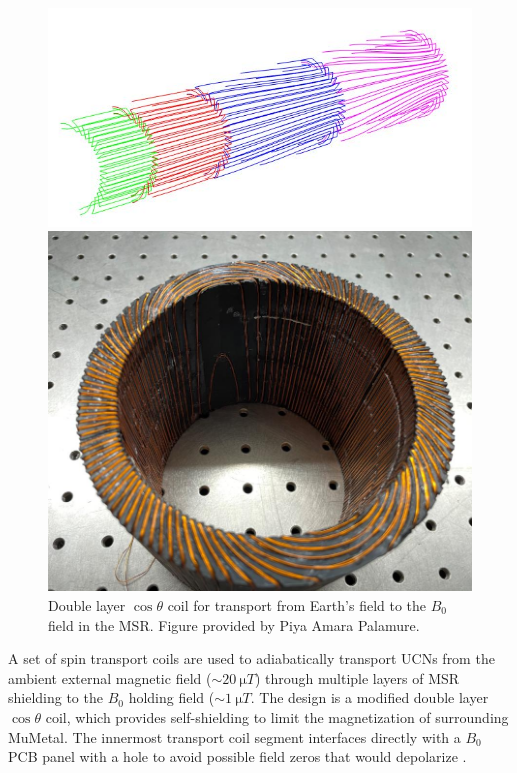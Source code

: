 \begin{figure}
\centering
\begin{minipage}{.5\textwidth}
    \centering
    \includegraphics[width=\textwidth]{figures/transport_coil_mockup.jpg}
\end{minipage}%
\begin{minipage}{.5\textwidth}
    \centering
    \includegraphics[width=\textwidth]{figures/transport_coil.jpg}
\end{minipage}
    \caption
    {Double layer $\cos\theta$ coil for transport from Earth's field to the $B_0$ field in the MSR. Figure provided by Piya Amara Palamure.}
    \label{fig:transport-coils}
\end{figure}

A set of spin transport coils are used to adiabatically transport UCNs from the ambient external magnetic field ($\sim\qty{20}{\micro T}$) through multiple layers of MSR shielding to the $B_0$ holding field ($\sim\qty{1}{\micro T}$. The design is a modified double layer $\cos\theta$ coil, which provides self-shielding to limit the magnetization of surrounding MuMetal. The innermost transport coil segment interfaces directly with a $B_0$ PCB panel with a hole to avoid possible field zeros that would depolarize \ucn. 

